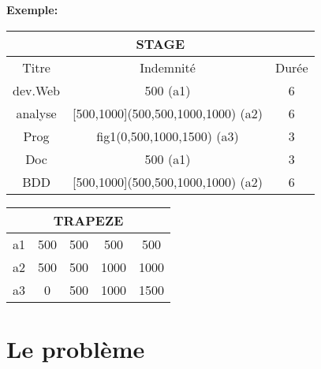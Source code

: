 \documentclass[a4paper,11pt]{article}
\begin{document}
\textbf{Exemple:}
\begin{center}
\begin{tabular}{|c|c|c|}
	\hline
	\multicolumn{3}{|c|}{\textbf{STAGE}}\\
	\hline 
	\hline
	Titre & Indemnité & Durée \\ 
	\hline
	\hline 
	dev.Web & 500 (a1) & 6 \\ 
	\hline 
	analyse & [500,1000](500,500,1000,1000) (a2) & 6 \\ 
	\hline 
	Prog & fig1(0,500,1000,1500) (a3) & 3 \\ 
	\hline 
	Doc & 500 (a1) & 3 \\ 
	\hline 
	BDD & [500,1000](500,500,1000,1000) (a2) & 6 \\ 
	\hline
\end{tabular} 
\end{center}

\begin{center}
\begin{tabular}{|c|c|c|c|c|}
	\hline
	\multicolumn{5}{|c|}{\textbf{TRAPEZE}}\\
	\hline
	\hline 
	a1 & 500 & 500 & 500 & 500 \\ 
	\hline 
	a2 & 500 & 500 & 1000 & 1000 \\ 
	\hline 
	a3 & 0 & 500 & 1000 & 1500 \\ 
	\hline 
\end{tabular} 
\end{center}

\section{Le problème}
\end{document}

